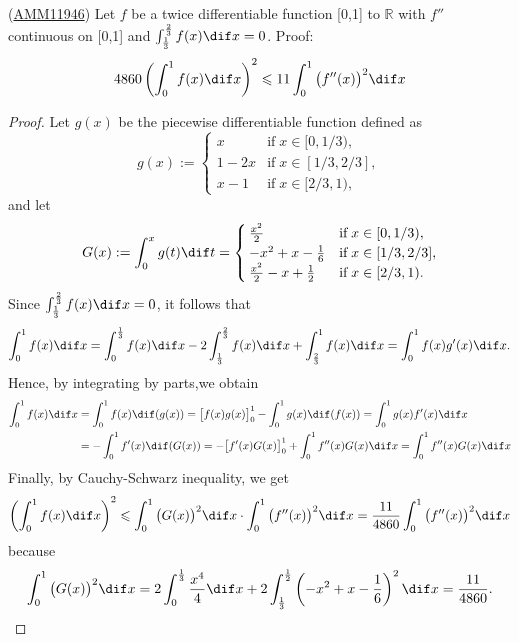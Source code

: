 \documentclass[color=green,titlestyle=hang]{elegantbook}%
\begin{document}
\begin{example}\label{exam:intneq-amm11946}
(\href{https://www.mat.uniroma2.it/~tauraso/AMM/AMM11946.pdf}{AMM11946}) %
Let $f$ be a twice differentiable function [0,1] to $\mathbb R$ with $f''$ continuous on [0,1] and $\int_{\frac{1}{3}}^{\frac{2}{3}}f(x)\dif x=0$. Proof:
\[4860\left(\int_0^1f(x)\dif x \right)^2\leqslant 11\int_0^1\big(f''(x)\big)^2\dif x \]
\end{example}\begin{proof}
Let $g(x)$ be the piecewise differentiable function defined as
\[g(x):=\begin{cases}
x   & \text{if}\; x\in[0,1/3),\\
1-2x& \text{if}\; x\in[1/3,2/3],\\
x-1 & \text{if}\; x\in[2/3,1),
\end{cases}\]
and let
\[G(x):=\int_0^xg(t)\dif t=\begin{cases}
\frac{x^2}{2}   & \text{if}\; x\in[0,1/3),\\
-x^2+x-\frac{1}{6}& \text{if}\; x\in[1/3,2/3],\\
\frac{x^2}{2}-x+\frac{1}{2}& \text{if}\; x\in[2/3,1).
\end{cases}  \]
Since $\int_{\frac{1}{3}}^{\frac{2}{3}}f(x)\dif x=0$, it follows that
\[\int_0^1 f(x)\dif x=\int_0^{\frac{1}{3}} f(x)\dif x-2\int_{\frac{1}{3}}^{\frac{2}{3}} f(x)\dif x+\int_{\frac{2}{3}}^1 f(x)\dif x=\int_0^1 f(x)g'(x)\dif x. \]
Hence, by integrating by parts,we obtain
\begin{align*}
\int_0^1 f(x)\dif x&=\int_0^1 f(x)\dif(g(x))=\big[f(x)g(x)\big]_0^1-\int_0^1 g(x)\dif(f(x))=\int_0^1 g(x)f'(x)\dif x\\
&=-\int_0^1 f'(x)\dif(G(x))=-\big[f'(x)G(x)\big]_0^1+\int_0^1 f''(x)G(x)\dif x=\int_0^1 f''(x)G(x)\dif x
\end{align*}
Finally, by Cauchy-Schwarz inequality, we get
\[\left(\int_0^1 f(x)\dif x\right)^2\leqslant \int_0^1 \big(G(x)\big)^2\dif x\cdot\int_0^1 \big(f''(x)\big)^2\dif x=\frac{11}{4860}\int_0^1 \big(f''(x)\big)^2\dif x \]
because 
\[\int_0^1 \big(G(x)\big)^2\dif x=2\int_0^{\frac{1}{3}} \frac{x^4}{4}\dif x+2\int_{\frac{1}{3}}^{\frac{1}{2}}\left(-x^2+x-\frac{1}{6}\right)^2\dif x=\frac{11}{4860}.\]
\end{proof}

\end{document}
